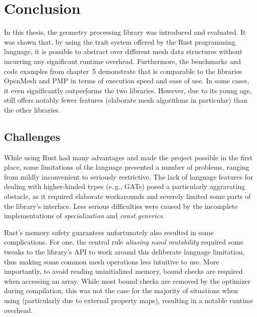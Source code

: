 \chapter{Conclusion}

In this thesis, the geometry processing library  was introduced and evaluated.
It was shown that, by using the trait system offered by the Rust programming language,  it is possible to abstract over different mesh data structures without incurring any significant runtime overhead.
Furthermore, the benchmarks and code examples from chapter~5 demonstrate that  is comparable to the \cpp libraries OpenMesh and PMP in terms of execution speed and ease of use.
In some cases, it even significantly outperforms the two \cpp libraries.
However, due to its young age,  still offers notably fewer features (elaborate mesh algorithms in particular) than the other libraries.



\vfill
\section{Challenges}

While using Rust had many advantages and made the project possible in the first place, some limitations of the language presented a number of problems, ranging from mildly inconvenient to seriously restrictive.
The lack of language features for dealing with higher-kinded types (e.\,g., GATs) posed a particularly aggravating obstacle, as it required elaborate workarounds and severely limited some parts of the library's interface.
Less serious difficulties were caused by the incomplete implementations of \emph{specialization} and \emph{const generics}.

Rust's memory safety guarantees unfortunately also resulted in some complications.
For one, the central rule \emph{aliasing nand mutability} required some tweaks to the library's API to work around this deliberate language limitation, thus making some common mesh operations less intuitive to use.
More importantly, to avoid reading uninitialized memory, bound checks are required when accessing an array.
While most bound checks are removed by the optimizer during compilation, this was not the case for the majority of situations when using  (particularly due to external property maps), resulting in a notable runtime overhead.

